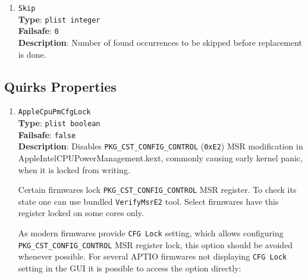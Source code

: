 \documentclass[]{article}
\begin{document}
\begin{enumerate}
\item
  \texttt{Skip}\\
  \textbf{Type}: \texttt{plist\ integer}\\
  \textbf{Failsafe}: \texttt{0}\\
  \textbf{Description}: Number of found occurrences to be skipped before replacement
  is done.

\end{enumerate}

\subsection{Quirks Properties}\label{kernelpropsquirks}

\begin{enumerate}

\item
  \texttt{AppleCpuPmCfgLock}\\
  \textbf{Type}: \texttt{plist\ boolean}\\
  \textbf{Failsafe}: \texttt{false}\\
  \textbf{Description}: Disables \texttt{PKG\_CST\_CONFIG\_CONTROL} (\texttt{0xE2})
  MSR modification in AppleIntelCPUPowerManagement.kext, commonly causing early
  kernel panic, when it is locked from writing.

  Certain firmwares lock \texttt{PKG\_CST\_CONFIG\_CONTROL} MSR register. To check its
  state one can use bundled \texttt{VerifyMsrE2} tool. Select firmwares have this
  register locked on some cores only.

  As modern firmwares provide \texttt{CFG Lock} setting, which allows configuring
  \texttt{PKG\_CST\_CONFIG\_CONTROL} MSR register lock, this option should be avoided
  whenever possible. For several APTIO firmwares not displaying \texttt{CFG Lock} setting
  in the GUI it is possible to access the option directly:


\end{enumerate}
\end{document}
